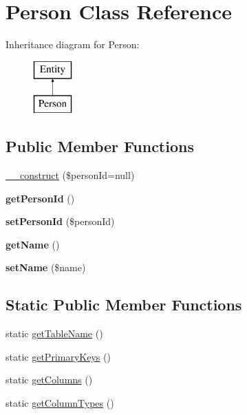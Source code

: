 \hypertarget{classPerson}{
\section{Person Class Reference}
\label{classPerson}
}
Inheritance diagram for Person:\begin{figure}[H]
\begin{center}
\leavevmode
\includegraphics[height=2.000000cm]{classPerson}
\end{center}
\end{figure}
\subsection*{Public Member Functions}
\begin{DoxyCompactItemize}
\item 
\hyperlink{classPerson_ae90ab9571c872e6b130d2cf46c1b47ce}{\_\-\_\-construct} (\$personId=null)
\item 
\hypertarget{classPerson_afadb1ac8614a060035c9992d2663e27e}{
{\bfseries getPersonId} ()}
\label{classPerson_afadb1ac8614a060035c9992d2663e27e}

\item 
\hypertarget{classPerson_a0033c4269f371539c82017b8e422ba39}{
{\bfseries setPersonId} (\$personId)}
\label{classPerson_a0033c4269f371539c82017b8e422ba39}

\item 
\hypertarget{classPerson_a48daf41676305e51a36b5452e2fe44c7}{
{\bfseries getName} ()}
\label{classPerson_a48daf41676305e51a36b5452e2fe44c7}

\item 
\hypertarget{classPerson_ae8252b8d2ada0b6aff2afe41e3185119}{
{\bfseries setName} (\$name)}
\label{classPerson_ae8252b8d2ada0b6aff2afe41e3185119}

\end{DoxyCompactItemize}
\subsection*{Static Public Member Functions}
\begin{DoxyCompactItemize}
\item 
static \hyperlink{classPerson_ab68a8aed417028b7755fb8c6c6fb2b62}{getTableName} ()
\item 
static \hyperlink{classPerson_a127a92657a50a2a51c8892dd625af9ee}{getPrimaryKeys} ()
\item 
static \hyperlink{classPerson_aeab90b54dcfecd955b00bd64ceec6eae}{getColumns} ()
\item 
static \hyperlink{classPerson_aed60680c05bbf313249396521da7df27}{getColumnTypes} ()
\end{DoxyCompactItemize}
